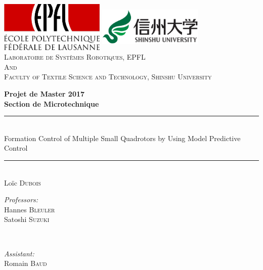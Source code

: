 \documentclass[a4paper, 12pt]{report}
\begin{document}
\begin{titlepage}
\newcommand{\HRule}{\rule{\linewidth}{0.5mm}} %
\center
 
\includegraphics[width=5cm,height=2.4cm]{logo/EPFL.png}
\hspace{7cm}
\includegraphics[width=5cm,height=2.4cm]{logo/Shinshu.png}\\
\vspace{1cm}
\textsc{\large Laboratoire de Systèmes Robotiques, EPFL}\\[0.3cm] 
\textsc{\Large And}\\[0.3cm] 
\textsc{\large Faculty of Textile Science and Technology, Shinshu University}\\[0.5cm] %
\vspace{3cm}

{ \huge \bfseries Projet de Master 2017\\
\large Section de Microtechnique\\[1.5cm]
\HRule \\[0.4cm]
\LARGE Formation Control of Multiple Small Quadrotors by Using Model Predictive Control} %
\HRule \\[1.5cm]
 
\Large Loïc \textsc{Dubois}\\ %
\vspace{2.5cm}

\begin{minipage}[t]{0.4\textwidth}
\begin{flushleft} \large
\emph{Professors:} \\
Hannes \textsc{Bleuler}\\ %
Satoshi \textsc{Suzuki}\\ %
\end{flushleft}
\end{minipage}
~
\begin{minipage}[t]{0.4\textwidth}
\begin{flushright} \large
\emph{Assistant:} \\
Romain \textsc{Baud}\\ %
\end{flushright} 
\end{minipage}\\[3cm]


\end{titlepage}
\end{document}
